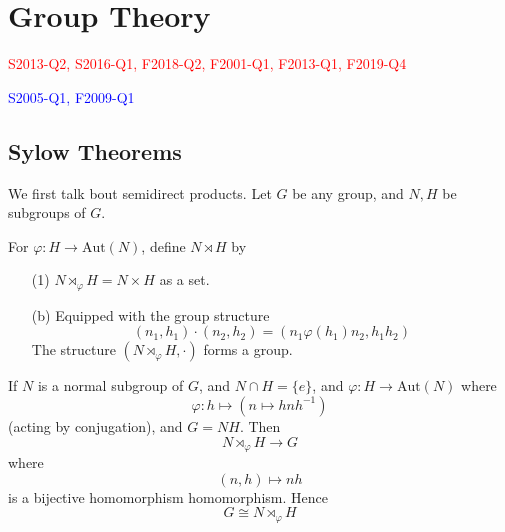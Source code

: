 



\chapter{Group Theory}
\textcolor{red}{S2013-Q2, S2016-Q1, F2018-Q2, F2001-Q1, F2013-Q1,  F2019-Q4}

\textcolor{blue}{S2005-Q1, F2009-Q1}


\section{Sylow Theorems}
We first talk bout semidirect products. Let $G$ be any group, and $N,H$ be subgroups of $G$.
\begin{defn}
For $\varphi:H\to\text{Aut}(N)$, define $N\rtimes H$ by 
\begin{itemize}
    \item[(1)] $N\rtimes_\varphi H=N\times H$ as a set.
    \item[(b)] Equipped with the group structure 
    \begin{equation*}
        (n_1,h_1)\cdot (n_2,h_2)=(n_1\varphi(h_1)n_2, h_1h_2)
    \end{equation*}
    The structure $(N\rtimes_\varphi H, \cdot)$ forms a group. 
\end{itemize}
\end{defn}

\begin{example}
    If $N$ is a normal subgroup of $G$, and $N\cap H=\{e\}$, and $\varphi:H\to\text{Aut}(N)$ where 
    \begin{equation*}
        \varphi: h\mapsto (n\mapsto hnh^{-1})
    \end{equation*}
    (acting by conjugation), and $G=NH$. Then 
    \begin{equation*}
        N\rtimes_\varphi H\to G
    \end{equation*}
    where 
    \begin{equation*}
        (n,h)\mapsto nh
    \end{equation*}
    is a bijective homomorphism homomorphism. Hence 
    \begin{equation*}
        G\cong N\rtimes_\varphi H
    \end{equation*}
\end{example}

